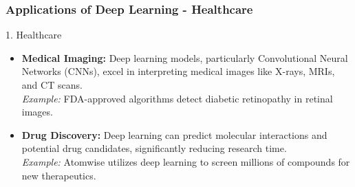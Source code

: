 \documentclass[aspectratio=169]{beamer}
\begin{document}
\begin{frame}[fragile]
    \frametitle{Applications of Deep Learning - Healthcare}
    \begin{block}{1. Healthcare}
        \begin{itemize}
            \item \textbf{Medical Imaging:} 
                Deep learning models, particularly Convolutional Neural Networks (CNNs), excel in interpreting medical images like X-rays, MRIs, and CT scans.
                \\ \textit{Example:} FDA-approved algorithms detect diabetic retinopathy in retinal images.
            \item \textbf{Drug Discovery:}
                Deep learning can predict molecular interactions and potential drug candidates, significantly reducing research time.
                \\ \textit{Example:} Atomwise utilizes deep learning to screen millions of compounds for new therapeutics.
        \end{itemize}
    \end{block}
\end{frame}
\end{document}
